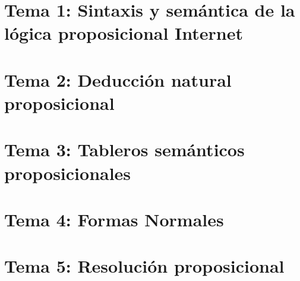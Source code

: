 \renewcommand{\contentsname}{Indice}
\tableofcontents
\newpage
\section{Tema 1: Sintaxis y semántica de la lógica proposicional Internet}

\newpage
\section{Tema 2: Deducción natural proposicional}

\newpage
\section{Tema 3: Tableros semánticos proposicionales}

\newpage
\section{Tema 4: Formas Normales}

\newpage
\section{Tema 5: Resolución proposicional}

